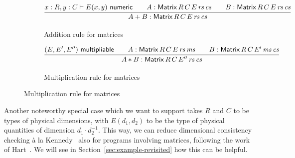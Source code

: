 \documentclass{IMEKO2024}
\newcommand{\istype}[1]{#1\ \textsf{type}}
\newcommand{\isadd}[1]{#1\ \textsf{numeric}}
\newcommand{\ismult}[3]{(#1, #2, #3)\ \textsf{multipliable}}
\newcommand{\Matrix}[5]{\mathsf{Matrix}\,#1\,#2\,#3\,#4\,#5}
\newcommand{\List}[1]{\mathsf{List}\,#1}
\begin{document}
%
\begin{figure}[th]
\begin{subfigure}{\textwidth}
  \begin{center}
    \[
      \infer{A + B : \Matrix{R}{C}{E}{\rs}{\cs}}
      {
        x : R, y : C \vdash \isadd{E(x, y)}
        &\quad
        A : \Matrix{R}{C}{E}{\rs}{\cs}
        &\quad
        B : \Matrix{R}{C}{E}{\rs}{\cs}
      }
    \]
  \end{center}
  \caption{Addition rule for matrices}
  \label{fig:matrix_add}
\end{subfigure}
\hfill
\begin{subfigure}{\textwidth}
  \begin{center}
    \[
      \infer{A * B : \Matrix{R}{C}{E''}{\rs}{\cs}}
      {
        \ismult{E}{E'}{E''}
        &\quad
        A : \Matrix{R}{C}{E}{\rs}{\ms}
        &\quad
        B : \Matrix{R}{C}{E'}{\ms}{\cs}
      }
    \]
  \end{center}
  \caption{Multiplication rule for matrices}
  \label{fig:matrix_mul}
\end{subfigure}
\label{fig:matrix_rules}
\end{figure}

Another noteworthy special case which we want to support takes $R$ and
$C$ to be types of physical dimensions, with $E(d_1, d_2)$ to be the
type of physical quantities of dimension $d_1 \cdot d_2^{-1}$.
%
This way, we can reduce dimensional consistency checking \`a la
Kennedy~\cite{kennedyUOM} also for programs involving matrices,
following the work of Hart~\cite{hart}.
%
We will see in Section~\ref{sec:example-revisited} how this can be helpful.
\end{document}
